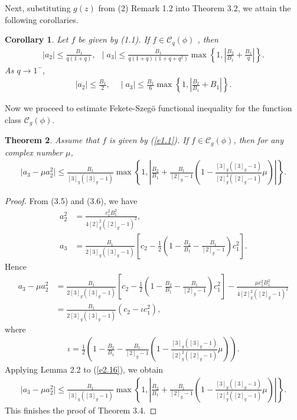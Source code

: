 \documentclass[11pt,twoside, reqno]{article}
\newtheorem{theorem}{Theorem}[section]
\newtheorem{corollary}[theorem]{Corollary}
\theoremstyle{definition}
\begin{document}
Next, substituting $g(z)$ from (2) Remark 1.2 into Theorem 3.2, we attain the following corollaries.
\begin{corollary}
Let $f$ be given by (1.1). If $f\in\mathcal{C}_{q}(\phi)$ , then
\begin{align}
\mid a_{2}\mid \leq \frac{B_{1}}{q(1+q)}\nonumber,
\ \
\mid a_{3}\mid \leq\frac{B_{1}}{q(1+q)(1+q+q^{2})}\max\left\{1, \left|\frac{B_{2}}{B_{1}}+\frac{B_{1}}{q}\right|\right\}.\nonumber
\end{align}
As $q\rightarrow1^{-}$,
\begin{align}\nonumber
\mid a_{2}\mid \leq \frac{B_{1}}{2},\quad\mid a_{3}\mid \leq\frac{B_{1}}{6}\max\left\{1, \left|\frac{B_{2}}{B_{1}}+B_{1}\right|\right\}.
\end{align}
\end{corollary}
Now we proceed to estimate Fekete-Szeg\"{o} functional inequality for the function class $\mathcal{C}_{g}(\phi)$.
\begin{theorem}
Assume that $f$ is given by (\ref{e1.1}). If $f\in\mathcal{C}_{g}(\phi)$, then for any complex number $\mu$,
\begin{align}\nonumber
\mid a_3-\mu a_2^2\mid\leq \frac{B_{1}}{[3]_{g}([3]_{g}-1)}\max\left\{1,\left|\frac{B_{2}}{B_{1}}+
\frac{B_{1}}{[2]_{g}-1}\left(1-\frac{[3]_{g}([3]_{g}-1)}{[2]_{g}^{2}([2]_{g}-1)}\mu\right)\right|\right\}.
\end{align}
\end{theorem}
\begin{proof}
From (3.5) and (3.6), we have
\begin{align}\nonumber
a_{2}^{2} &= \frac{c_{1}^{2}B_{1}^{2}}{4[2]_{g}^{2}([2]_{g}-1)^{2}}, \\\nonumber
a_{3} &= \frac{B_{1}}{2[3]_{g}([3]_{g}-1)}\left[c_{2}-\frac{1}{2}\left(1-\frac{B_{2}}{B_{1}}-\frac{B_{1}}{[2]_{g}-1}\right)c_{1}^{2}\right].
\end{align}
Hence
\begin{align}\nonumber\label{e2.16}
a_{3}-\mu a_{2}^{2}&=\frac{B_{1}}{2[3]_{g}([3]_{g}-1)}\left[c_{2}-\frac{1}{2}\left(1-\frac{B_{2}}{B_{1}}-\frac{B_{1}}{[2]_{g}-1}\right)c_{1}^{2}\right]-\frac{\mu c_{1}^{2}B_{1}^{2}}{4[2]_{g}^{2}([2]_{g}-1)^{2}}\\
&=\frac{B_{1}}{2[3]_{g}([3]_{g}-1)}(c_{2}-\iota c_{1}^{2}),
\end{align}
where
\begin{align}\nonumber
\iota=\frac{1}{2}\left(1-\frac{B_{2}}{B_{1}}-
\frac{B_{1}}{[2]_{g}-1}\left(1-\frac{[3]_{g}([3]_{g}-1)}{[2]_{g}^{2}([2]_{g}-1)}\mu\right)\right).
\end{align}
Applying Lemma 2.2 to (\ref{e2.16}), we obtain
\begin{align}\nonumber
\mid a_3-\mu a_2^2\mid\leq \frac{B_{1}}{[3]_{g}([3]_{g}-1)}\max\left\{1,\left|\frac{B_{2}}{B_{1}}+
\frac{B_{1}}{[2]_{g}-1}\left(1-\frac{[3]_{g}([3]_{g}-1)}{[2]_{g}^{2}([2]_{g}-1)}\mu\right)\right|\right\}.
\end{align}
This finishes the proof of Theorem 3.4.
\end{proof}
\end{document}
